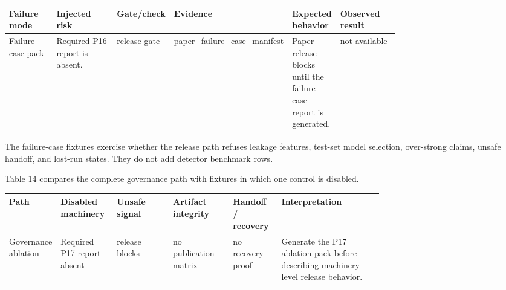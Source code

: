 \documentclass[11pt]{article}
\begin{document}
\begin{center}
\begin{minipage}{\linewidth}
\scriptsize
\setlength{\tabcolsep}{3pt}
\renewcommand{\arraystretch}{1.16}
\begin{tabularx}{\linewidth}{@{}>{\raggedright\arraybackslash}p{0.13\linewidth} >{\raggedright\arraybackslash}p{0.17\linewidth} >{\raggedright\arraybackslash}p{0.13\linewidth} >{\raggedright\arraybackslash}p{0.16\linewidth} >{\raggedright\arraybackslash}X >{\raggedright\arraybackslash}p{0.16\linewidth}@{}}
\toprule
Failure mode & Injected risk & Gate/check & Evidence & Expected behavior & Observed result \\
\midrule
Failure-case pack & Required P16 report is absent. & release gate & paper\_failure\_case\_manifest & Paper release blocks until the failure-case report is generated. & not available \\
\bottomrule
\end{tabularx}
\end{minipage}
\end{center}


The failure-case fixtures exercise whether the release path refuses leakage features, test-set model selection, over-strong claims, unsafe handoff, and lost-run states. They do not add detector benchmark rows.

Table 14 compares the complete governance path with fixtures in which one control is disabled.

\begin{center}
\begin{minipage}{\linewidth}
\scriptsize
\setlength{\tabcolsep}{3pt}
\renewcommand{\arraystretch}{1.16}
\begin{tabularx}{\linewidth}{@{}>{\raggedright\arraybackslash}p{0.13\linewidth} >{\raggedright\arraybackslash}p{0.15\linewidth} >{\raggedright\arraybackslash}p{0.15\linewidth} >{\raggedright\arraybackslash}p{0.16\linewidth} >{\raggedright\arraybackslash}p{0.13\linewidth} >{\raggedright\arraybackslash}X@{}}
\toprule
Path & Disabled machinery & Unsafe signal & Artifact integrity & Handoff / recovery & Interpretation \\
\midrule
Governance ablation & Required P17 report absent & release blocks & no publication matrix & no recovery proof & Generate the P17 ablation pack before describing machinery-level release behavior. \\
\bottomrule
\end{tabularx}
\end{minipage}
\end{center}
\end{document}
